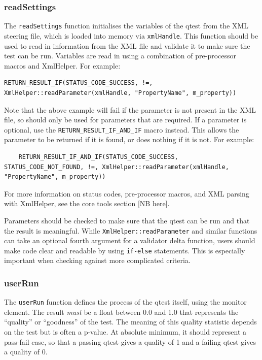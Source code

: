 \subsubsection{readSettings}
The \texttt{readSettings} function initialises the variables of the qtest from the XML steering file, which is loaded into memory via \texttt{xmlHandle}. This function should be used to read in information from the XML file and validate it to make sure the test can be run. Variables are read in using a combination of pre-processor macros and XmlHelper. For example:

\begin{verbatim}
RETURN_RESULT_IF(STATUS_CODE_SUCCESS, !=, XmlHelper::readParameter(xmlHandle, "PropertyName", m_property))
\end{verbatim}

Note that the above example will fail if the parameter is not present in the XML file, so should only be used for parameters that are required. If a parameter is optional, use the \texttt{RETURN\_RESULT\_IF\_AND\_IF} macro instead. This allows the parameter to be returned if it is found, or does nothing if it is not. For example:

\begin{verbatim}
    RETURN_RESULT_IF_AND_IF(STATUS_CODE_SUCCESS, STATUS_CODE_NOT_FOUND, !=, XmlHelper::readParameter(xmlHandle, "PropertyName", m_property))
\end{verbatim}

For more information on status codes, pre-processor macros, and XML parsing with XmlHelper, see the core tools section [NB here].

Parameters should be checked to make sure that the qtest can be run and that the result is meaningful. While \texttt{XmlHelper::readParameter} and similar functions can take an optional fourth argument for a validator delta function, users should make code clear and readable by using \texttt{if-else} statements. This is especially important when checking against more complicated criteria.

\subsubsection{userRun}

The \texttt{userRun} function defines the process of the qtest itself, using the monitor element. The result \textit{must} be a float between 0.0 and 1.0 that represents the ``quality'' or ``goodness'' of the test. The meaning of this quality statistic depends on the test but is often a p-value. At absolute minimum, it should represent a pass-fail case, so that a passing qtest gives a quality of 1 and a failing qtest gives a quality of 0.

